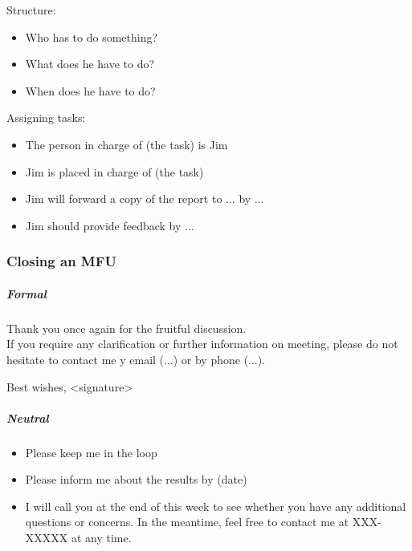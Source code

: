 Structure:\\
\begin{itemize}
\item Who has to do something?
\item What does he have to do?
\item When does he have to do?
\end{itemize}

Assigning tasks:\\
\begin{itemize}
\item The person in charge of (the task) is Jim
\item Jim is placed in charge of (the task)
\item Jim will forward a copy of the report to ... by ...
\item Jim should provide feedback by ...
\end{itemize}
\subsubsection{Closing an MFU}
\subparagraph{Formal}

Thank you once again for the fruitful discussion.\\

If you require any clarification or further information on meeting, please do not hesitate to contact me y email (...) or by phone (...).

Best wishes,
<signature>

\subparagraph{Neutral}
\begin{itemize}
\item Please keep me in the loop
\item Please inform me about the results by (date)
\item I will call you at the end of this week to see whether you have any additional questions or concerns. In the meantime, feel free to contact me at XXX-XXXXX at any time.
\end{itemize}

